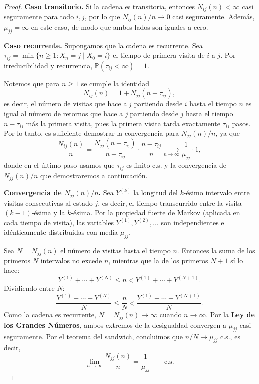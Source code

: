 \documentclass[12pt]{book}
\begin{document}
\begin{proof}
\textbf{Caso transitorio.} Si la cadena es transitoria, entonces $N_{ij}(n) < \infty$ casi seguramente para todo $i, j$, por lo que $N_{ij}(n)/n \to 0$ casi seguramente. Además, $\mu_{jj} = \infty$ en este caso, de modo que ambos lados son iguales a cero.

\textbf{Caso recurrente.} Supongamos que la cadena es recurrente. Sea $\tau_{ij} = \min\{n \ge 1 : X_n = j \mid X_0 = i\}$ el tiempo de primera visita de $i$ a $j$. Por irreducibilidad y recurrencia, $\mathbb{P}(\tau_{ij} < \infty) = 1$.

Notemos que para $n \ge 1$ se cumple la identidad
\[
N_{ij}(n) = 1+ N_{jj}(n - \tau_{ij}),
\]
es decir, el número de visitas que hace a $j$ partiendo desde $i$ hasta el tiempo $n$ es igual al número de retornos que hace a $j$ partiendo desde $j$ hasta el tiempo $n - \tau_{ij}$ más la primera visita, pues la primera visita tarda exactamente $\tau_{ij}$ pasos. Por lo tanto, es suficiente demostrar la convergencia para $N_{jj}(n)/n$, ya que
\[
\frac{N_{ij}(n)}{n} = \frac{N_{jj}(n - \tau_{ij})}{n - \tau_{ij}} \cdot \frac{n - \tau_{ij}}{n} \xrightarrow[n\to\infty]{} \frac{1}{\mu_{jj}} \cdot 1,
\]
donde en el último paso usamos que $\tau_{ij}$ es finito c.s. y la convergencia de $N_{jj}(n)/n$ que demostraremos a continuación.

\textbf{Convergencia de $N_{jj}(n)/n$.} Sea $Y^{(k)}$ la longitud del $k$-ésimo intervalo entre visitas consecutivas al estado $j$, es decir, el tiempo transcurrido entre la visita $(k-1)$-ésima y la $k$-ésima. Por la propiedad fuerte de Markov (aplicada en cada tiempo de visita), las variables $Y^{(1)}, Y^{(2)}, \dots$ son independientes e idénticamente distribuidas con media $\mu_{jj}$.

Sea $N = N_{jj}(n)$ el número de visitas hasta el tiempo $n$. Entonces la suma de los primeros $N$ intervalos no excede $n$, mientras que la de los primeros $N+1$ sí lo hace:
\[
Y^{(1)} + \cdots + Y^{(N)} \le n < Y^{(1)} + \cdots + Y^{(N+1)}.
\]
Dividiendo entre $N$:
\[
\frac{Y^{(1)} + \cdots + Y^{(N)}}{N} \le \frac{n}{N} < \frac{Y^{(1)} + \cdots + Y^{(N+1)}}{N}.
\]
Como la cadena es recurrente, $N = N_{jj}(n) \to \infty$ cuando $n \to \infty$. Por la \textbf{Ley de los Grandes Números}, ambos extremos de la desigualdad convergen a $\mu_{jj}$ casi seguramente. Por el teorema del sandwich, concluimos que $n/N \to \mu_{jj}$ c.s., es decir,
\[
\lim_{n \to \infty} \frac{N_{jj}(n)}{n} = \frac{1}{\mu_{jj}} \qquad \text{c.s.}
\]
\end{proof}
\end{document}
